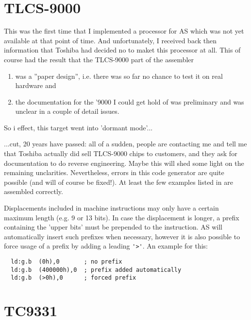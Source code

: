 \documentclass[12pt,twoside]{report}
\newcommand{\asname}{{AS}}
\begin{document}

\section{TLCS-9000}

This was the first time that I implemented a processor for \asname{} which
was not yet available at that point of time.  And unfortunately,
I received back then information that Toshiba had decided no to
maket this processor at all.  This of course had the result that
the TLCS-9000 part of the assembler
\begin{enumerate}
\item{was a ''paper design'', i.e. there was so far no chance to test
      it on real hardware and}
\item{the documentation for the '9000 I could get hold of \cite{Tosh9000}
      was preliminary and was unclear in a couple of detail
      issues.}
\end{enumerate}
So i effect, this target went into 'dormant mode'...

...cut, 20 years have passed: all of a sudden, people are
contacting me and tell me that Toshiba actually did sell
TLCS-9000 chips to customers, and they ask for documentation to
do reverse engineering.  Maybe this will shed some light on the
remaining unclarities.  Nevertheless, errors in this code generator
are quite possible (and will of course be fixed!).  At least the
few examples listed in \cite{Tosh9000} are assembled correctly.

Displacements included in machine instructions may only have a
certain maximum length (e.g. 9 or 13 bits).  In case the
displacement is longer, a prefix containing the 'upper bits' must
be prepended to the instruction.  \asname{} will automatically insert
such prefixes when necessary, however it is also possible to
force usage of a prefix by adding a leading \verb!'>'!.  An
example for this:

\begin{verbatim}
  ld:g.b  (0h),0       ; no prefix
  ld:g.b  (400000h),0  ; prefix added automatically
  ld:g.b  (>0h),0      ; forced prefix
\end{verbatim}


\section{TC9331}
\end{document}
